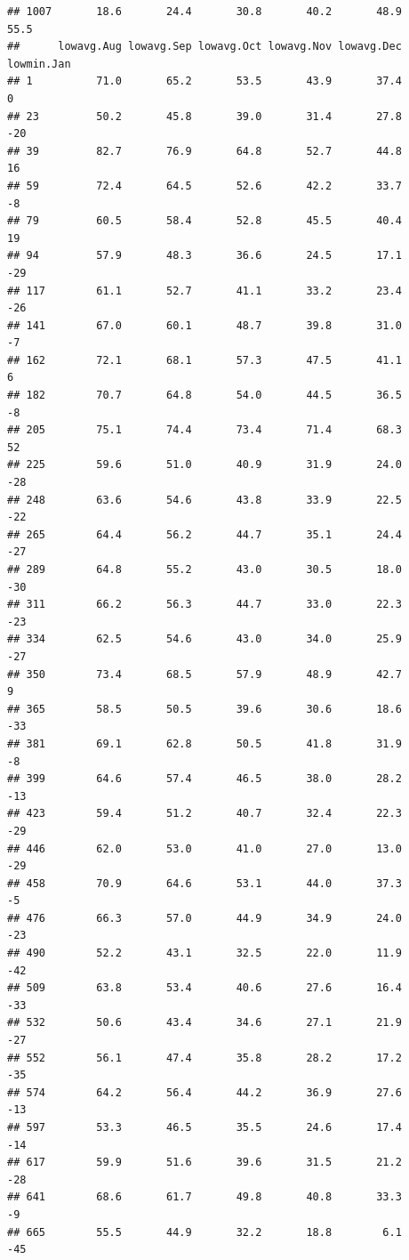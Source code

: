 \documentclass[
]{article}
\begin{document}
\begin{verbatim}
## 1007       18.6       24.4       30.8       40.2       48.9       55.5
##      lowavg.Aug lowavg.Sep lowavg.Oct lowavg.Nov lowavg.Dec lowmin.Jan
## 1          71.0       65.2       53.5       43.9       37.4          0
## 23         50.2       45.8       39.0       31.4       27.8        -20
## 39         82.7       76.9       64.8       52.7       44.8         16
## 59         72.4       64.5       52.6       42.2       33.7         -8
## 79         60.5       58.4       52.8       45.5       40.4         19
## 94         57.9       48.3       36.6       24.5       17.1        -29
## 117        61.1       52.7       41.1       33.2       23.4        -26
## 141        67.0       60.1       48.7       39.8       31.0         -7
## 162        72.1       68.1       57.3       47.5       41.1          6
## 182        70.7       64.8       54.0       44.5       36.5         -8
## 205        75.1       74.4       73.4       71.4       68.3         52
## 225        59.6       51.0       40.9       31.9       24.0        -28
## 248        63.6       54.6       43.8       33.9       22.5        -22
## 265        64.4       56.2       44.7       35.1       24.4        -27
## 289        64.8       55.2       43.0       30.5       18.0        -30
## 311        66.2       56.3       44.7       33.0       22.3        -23
## 334        62.5       54.6       43.0       34.0       25.9        -27
## 350        73.4       68.5       57.9       48.9       42.7          9
## 365        58.5       50.5       39.6       30.6       18.6        -33
## 381        69.1       62.8       50.5       41.8       31.9         -8
## 399        64.6       57.4       46.5       38.0       28.2        -13
## 423        59.4       51.2       40.7       32.4       22.3        -29
## 446        62.0       53.0       41.0       27.0       13.0        -29
## 458        70.9       64.6       53.1       44.0       37.3         -5
## 476        66.3       57.0       44.9       34.9       24.0        -23
## 490        52.2       43.1       32.5       22.0       11.9        -42
## 509        63.8       53.4       40.6       27.6       16.4        -33
## 532        50.6       43.4       34.6       27.1       21.9        -27
## 552        56.1       47.4       35.8       28.2       17.2        -35
## 574        64.2       56.4       44.2       36.9       27.6        -13
## 597        53.3       46.5       35.5       24.6       17.4        -14
## 617        59.9       51.6       39.6       31.5       21.2        -28
## 641        68.6       61.7       49.8       40.8       33.3         -9
## 665        55.5       44.9       32.2       18.8        6.1        -45

\end{verbatim}
\end{document}
